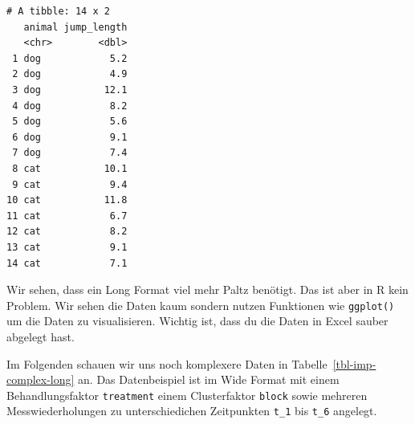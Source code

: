 \documentclass[
  letterpaper,
]{scrbook}
\begin{document}
\begin{verbatim}
# A tibble: 14 x 2
   animal jump_length
   <chr>        <dbl>
 1 dog            5.2
 2 dog            4.9
 3 dog           12.1
 4 dog            8.2
 5 dog            5.6
 6 dog            9.1
 7 dog            7.4
 8 cat           10.1
 9 cat            9.4
10 cat           11.8
11 cat            6.7
12 cat            8.2
13 cat            9.1
14 cat            7.1
\end{verbatim}

Wir sehen, dass ein Long Format viel mehr Paltz benötigt. Das ist aber
in R kein Problem. Wir sehen die Daten kaum sondern nutzen Funktionen
wie \texttt{ggplot()} um die Daten zu visualisieren. Wichtig ist, dass
du die Daten in Excel sauber abgelegt hast.

Im Folgenden schauen wir uns noch komplexere Daten in
Tabelle~\ref{tbl-imp-complex-long} an. Das Datenbeispiel ist im Wide
Format mit einem Behandlungsfaktor \texttt{treatment} einem
Clusterfaktor \texttt{block} sowie mehreren Messwiederholungen zu
unterschiedichen Zeitpunkten \texttt{t\_1} bis \texttt{t\_6} angelegt.
\end{document}
